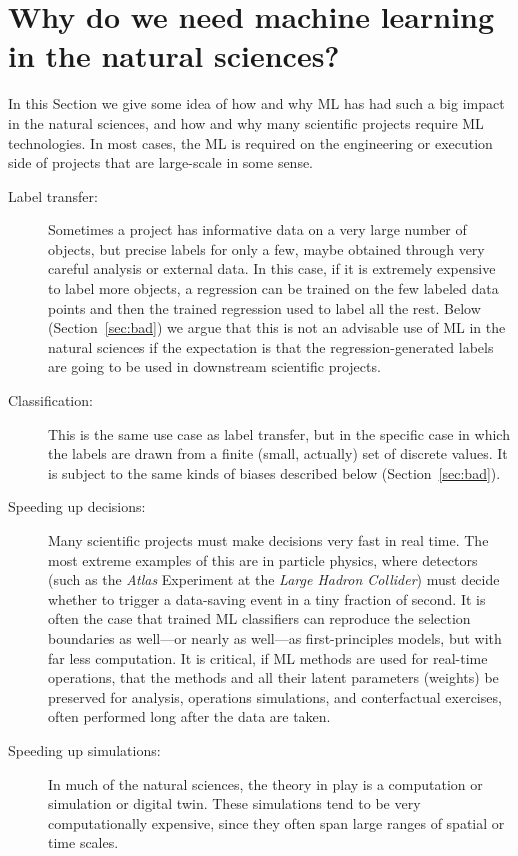 \documentclass[10pt]{article}
\newcommand{\sectionname}{Section}
\newcommand{\secref}[1]{\sectionname~\ref{#1}}
\begin{document}
\section{Why do we need machine learning in the natural sciences?}\label{sec:why}
In this \sectionname{} we give some idea of how and why ML has had such a big impact in the natural sciences, and how and why many scientific projects require ML technologies.
In most cases, the ML is required on the engineering or execution side of projects that are large-scale in some sense.
\begin{description}
  \item[Label transfer:] Sometimes a project has informative data on a very large number of objects, but precise labels for only a few, maybe obtained through very careful analysis or external data.
  In this case, if it is extremely expensive to label more objects, a regression can be trained on the few labeled data points and then the trained regression used to label all the rest.
  Below (\secref{sec:bad}) we argue that this is not an advisable use of ML in the natural sciences if the expectation is that the regression-generated labels are going to be used in downstream scientific projects.
  \item[Classification:] This is the same use case as label transfer, but in the specific case in which the labels are drawn from a finite (small, actually) set of discrete values.
  It is subject to the same kinds of biases described below (\secref{sec:bad}).
  \item[Speeding up decisions:] Many scientific projects must make decisions very fast in real time.
  The most extreme examples of this are in particle physics, where detectors (such as the \textsl{Atlas} Experiment \cite{atlas} at the \textsl{Large Hadron Collider}) must decide whether to trigger a data-saving event in a tiny fraction of second.
  It is often the case that trained ML classifiers can reproduce the selection boundaries as well---or nearly as well---as first-principles models, but with far less computation.
  It is critical, if ML methods are used for real-time operations, that the methods and all their latent parameters (weights) be preserved for analysis, operations simulations, and conterfactual exercises, often performed long after the data are taken.
  \item[Speeding up simulations:] In much of the natural sciences, the theory in play is a computation or simulation or digital twin.
  These simulations tend to be very computationally expensive, since they often span large ranges of spatial or time scales.

\end{description}
\end{document}
